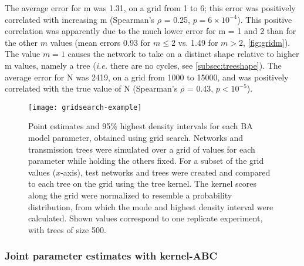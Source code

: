 The average error for \gls{m} was
    1.31,
on a grid from 1 to 6; this error was positively correlated with increasing
\gls{m}
    (Spearman's $\rho$ = 0.25,
     $p = 6\!\times\!10^{-4}$).
This positive correlation was apparently due to the much lower error for
\gls{m} = 1 and 2 than for the other $m$ values 
    (mean errors 
    0.93 
    for $m \leq 2$ vs. 
    1.49 
    for $m > 2$, \cref{fig:gridm}).
The value $m = 1$ causes the network to take on a distinct shape relative to
higher \gls{m} values, namely a tree (\textit{i.e.} there are no cycles,
see \cref{subsec:treeshape}). The average error for \gls{N} was 
    2419,
on a grid from 1000 to 15000, and was positively correlated with the true value
of \gls{N}
    (Spearman's $\rho$ = 0.43,
    $p {<}10^{-5}$).

\begin{figure}[ht]
  \centering
  \texttt{[image: gridsearch-example]}
  \caption[Grid search estimates of \gls{BA} model parameters]{Point estimates
      and 95\% highest density intervals for each \gls{BA} model parameter,
      obtained using grid search. Networks and transmission trees were
      simulated over a grid of values for each parameter while holding the
      others fixed. For a subset of the grid values ($x$-axis), test networks
      and trees were created and compared to each tree on the grid using the
      tree kernel. The kernel scores along the grid were normalized to resemble
      a probability distribution, from which the mode and highest density
      interval were calculated. Shown values correspond to one replicate
      experiment, with trees of size 500.
  } 
  \label{fig:gridest}
\end{figure}

\subsubsection*{Joint parameter estimates with kernel-ABC}



